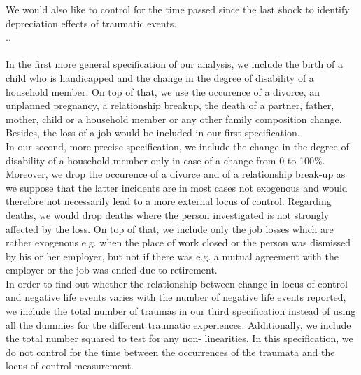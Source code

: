 \documentclass[12pt,a4paper,fleqn]{article}
\begin{document}
We would also like to control for the time passed since the last shock to
identify depreciation effects of traumatic events.\\
..\\
\\
In the first more general specification of our analysis, we include
the birth of a child who is handicapped and the change in the degree of
disability of a household member. On top of that, we use the occurence of a divorce,
an unplanned pregnancy, a relationship breakup, the death of a partner, father,
mother, child or a household member or
any other family composition change. Besides, the loss of a job would be included in our first specification. \\

In our second, more precise specification, we include the change in the degree of disability of a
household member only in case of a change from 0 to 100\%. Moreover, we drop the occurence
of a divorce and of a relationship break-up as we suppose
that the latter incidents are in most cases not exogenous and would therefore
not necessarily lead to a more external locus of control. Regarding
deaths, we would drop deaths where the person investigated is not strongly
affected by the loss. On top of that, we include
only the job losses which are rather exogenous e.g. when the place of work
closed or the person was dismissed by his or her employer, but not if there was
e.g. a mutual agreement with the employer or the job was ended due to
retirement.\\

In order to find out whether the relationship between change in locus of
control and negative life events varies with the number of negative life events
reported, we include the total number of traumas in our third specification
instead of using all the dummies for the different traumatic experiences. Additionally, we
include the total number squared to test for any non-
linearities. In this specification, we do not control for the time between the
occurrences of the traumata and the locus of control measurement.\\
\end{document}
